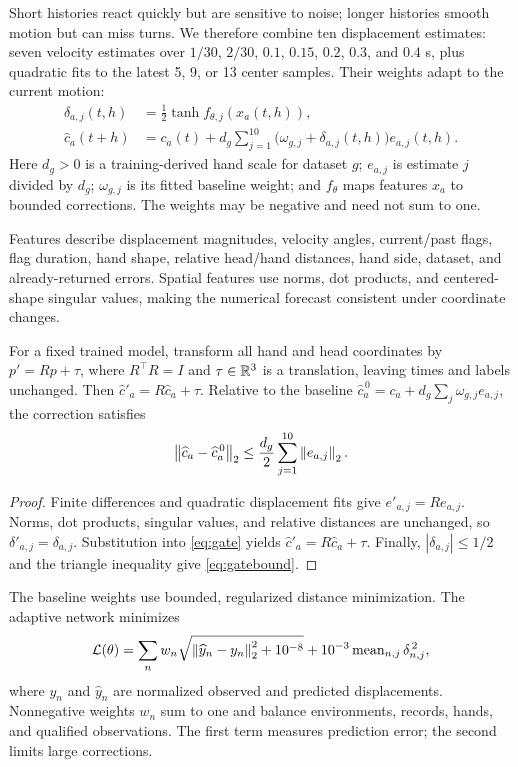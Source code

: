 Short histories react quickly but are sensitive to noise; longer histories smooth motion but can miss turns. We therefore combine ten displacement estimates: seven velocity estimates over $1/30$, $2/30$, $0.1$, $0.15$, $0.2$, $0.3$, and $0.4$ s, plus quadratic fits to the latest 5, 9, or 13 center samples. Their weights adapt to the current motion:
\begin{align}
\delta_{a,j}(t,h)&=\tfrac12\tanh f_{\theta,j}(x_a(t,h)), \label{eq:correction}\\
\widehat c_a(t+h)&=c_a(t)+d_g\sum_{j=1}^{10}
\bigl(\omega_{g,j}+\delta_{a,j}(t,h)\bigr)e_{a,j}(t,h).
\label{eq:gate}
\end{align}
\noindent Here $d_g>0$ is a training-derived hand scale for dataset $g$; $e_{a,j}$ is estimate $j$ divided by $d_g$; $\omega_{g,j}$ is its fitted baseline weight; and $f_\theta$ maps features $x_a$ to bounded corrections. The weights may be negative and need not sum to one.

Features describe displacement magnitudes, velocity angles, current/past flags, flag duration, hand shape, relative head/hand distances, hand side, dataset, and already-returned errors. Spatial features use norms, dot products, and centered-shape singular values, making the numerical forecast consistent under coordinate changes.

\begin{proposition}
\label{prop:equivariance}
For a fixed trained model, transform all hand and head coordinates by $p'=Rp+\tau$, where $R^\top R=I$ and $\tau\in\mathbb{R}^3$ is a translation, leaving times and labels unchanged. Then $\widehat c'_a=R\widehat c_a+\tau$. Relative to the baseline $\widehat c_a^{\,0}=c_a+d_g\sum_j \omega_{g,j}e_{a,j}$, the correction satisfies
\begin{equation}
\left\lVert \widehat c_a-\widehat c_a^{\,0}\right\rVert_2
\leq \frac{d_g}{2}\sum_{j=1}^{10}\left\lVert e_{a,j}\right\rVert_2.
\label{eq:gatebound}
\end{equation}
\end{proposition}
\begin{proof}
Finite differences and quadratic displacement fits give $e'_{a,j}=Re_{a,j}$. Norms, dot products, singular values, and relative distances are unchanged, so $\delta'_{a,j}=\delta_{a,j}$. Substitution into \eqref{eq:gate} yields $\widehat c'_a=R\widehat c_a+\tau$. Finally, $|\delta_{a,j}|\leq1/2$ and the triangle inequality give \eqref{eq:gatebound}.
\end{proof}

The baseline weights use bounded, regularized distance minimization. The adaptive network minimizes
\begin{equation}
\mathcal L(\theta)=
\sum_n w_n\sqrt{\left\lVert \widehat y_n-y_n\right\rVert_2^2+10^{-8}}
+10^{-3}\operatorname{mean}_{n,j}\delta_{n,j}^{\,2},
\label{eq:training}
\end{equation}
\noindent where $y_n$ and $\widehat y_n$ are normalized observed and predicted displacements. Nonnegative weights $w_n$ sum to one and balance environments, records, hands, and qualified observations. The first term measures prediction error; the second limits large corrections.

